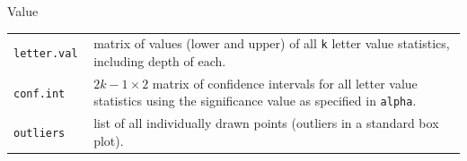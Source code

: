 \documentclass[11pt]{article}
\begin{document}
Value

\begin{tabular}{lp{2.2in}}
\tt letter.val & matrix of values (lower and upper) of all {\tt k} 
letter value statistics, including depth of each.\\
\tt conf.int & $2k-1 \times 2$ matrix of confidence intervals for 
all letter value statistics using the significance value as 
specified in {\tt alpha}.\\ 
\tt outliers & list of all individually drawn points (outliers 
in a standard box plot).\\
\end{tabular}



\end{document}
